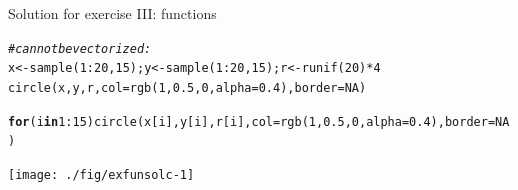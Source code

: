 \documentclass[xcolor=table,           xcolor=dvipsnames]{beamer}\usepackage[]{graphicx}\usepackage[]{color}
\makeatletter
\newcommand{\hlnum}[1]{\textcolor[rgb]{0,0,0}{#1}}
\newcommand{\hlcom}[1]{\textcolor[rgb]{0,0.392,0}{\textit{#1}}}
\newcommand{\hlopt}[1]{\textcolor[rgb]{0,0,0}{#1}}
\newcommand{\hlstd}[1]{\textcolor[rgb]{0,0,0}{#1}}
\newcommand{\hlkwa}[1]{\textcolor[rgb]{1,0,0}{\textbf{#1}}}
\newcommand{\hlkwb}[1]{\textcolor[rgb]{0,0,0}{#1}}
\newcommand{\hlkwc}[1]{\textcolor[rgb]{1,0,1}{#1}}
\newcommand{\hlkwd}[1]{\textcolor[rgb]{0,0,1}{#1}}
\newenvironment{kframe}{%
 \def\at@end@of@kframe{}%
 \ifinner\ifhmode%
  \def\at@end@of@kframe{\end{minipage}}%
  \begin{minipage}{\columnwidth}%
 \fi\fi%
 \def\FrameCommand##1{\hskip\@totalleftmargin \hskip-\fboxsep
 \colorbox{shadecolor}{##1}\hskip-\fboxsep
     \hskip-\linewidth \hskip-\@totalleftmargin \hskip\columnwidth}%
 \MakeFramed {\advance\hsize-\width
   \@totalleftmargin\z@ \linewidth\hsize
   \@setminipage}}%
 {\par\unskip\endMakeFramed%
 \at@end@of@kframe}
\newenvironment{knitrout}{}{} %
\newcounter{exercisecount}
\makeatother
\begin{document}
\begin{frame}[fragile]{Solution for exercise  III: functions}
\begin{knitrout}\scriptsize
{}\color{fgcolor}\begin{kframe}
\begin{alltt}
\hlcom{# can not be vectorized:}
\hlstd{x} \hlkwb{<-} \hlkwd{sample}\hlstd{(}\hlnum{1}\hlopt{:}\hlnum{20}\hlstd{,} \hlnum{15}\hlstd{) ;  y} \hlkwb{<-} \hlkwd{sample}\hlstd{(}\hlnum{1}\hlopt{:}\hlnum{20}\hlstd{,} \hlnum{15}\hlstd{) ; r} \hlkwb{<-} \hlkwd{runif}\hlstd{(}\hlnum{20}\hlstd{)}\hlopt{*}\hlnum{4}
\hlkwd{circle}\hlstd{(x,y,r,} \hlkwc{col}\hlstd{=}\hlkwd{rgb}\hlstd{(}\hlnum{1}\hlstd{,}\hlnum{0.5}\hlstd{,}\hlnum{0}\hlstd{,}\hlkwc{alpha}\hlstd{=}\hlnum{0.4}\hlstd{),} \hlkwc{border}\hlstd{=}\hlnum{NA}\hlstd{)}
\end{alltt}


{\ttfamily\noindent\color{warningcolor}{\#\# Warning in circle(x, y, r, col = rgb(1, 0.5, 0, alpha = 0.4), border = NA): Only the first element of the vectors is used.}}\begin{alltt}
\hlkwa{for}\hlstd{(i} \hlkwa{in} \hlnum{1}\hlopt{:}\hlnum{15}\hlstd{)} \hlkwd{circle}\hlstd{(x[i],y[i],r[i],} \hlkwc{col}\hlstd{=}\hlkwd{rgb}\hlstd{(}\hlnum{1}\hlstd{,}\hlnum{0.5}\hlstd{,}\hlnum{0}\hlstd{,}\hlkwc{alpha}\hlstd{=}\hlnum{0.4}\hlstd{),} \hlkwc{border}\hlstd{=}\hlnum{NA}\hlstd{)}
\end{alltt}
\end{kframe}

{\centering \texttt{[image: ./fig/exfunsolc-1]} 

}



\end{knitrout}
\end{frame}

\end{document}
